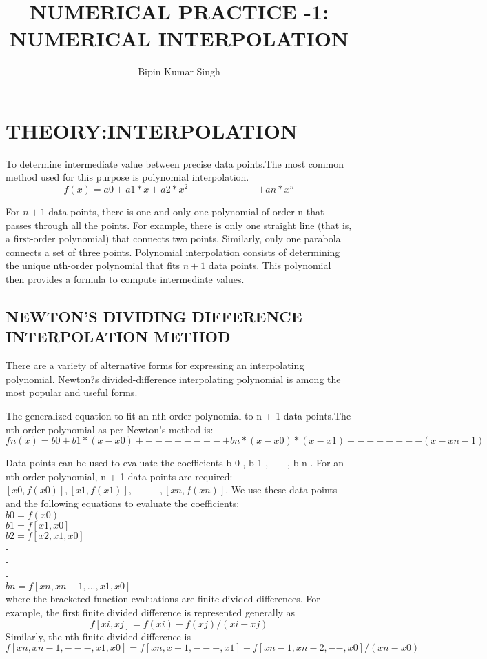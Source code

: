 \documentclass[10pt,a4paper]{article}
\author{Bipin Kumar Singh}
\title{NUMERICAL PRACTICE -1: NUMERICAL INTERPOLATION}
\begin{document}
	\maketitle

\section{THEORY:INTERPOLATION}
To determine intermediate value between precise data points.The most common method used for this purpose is polynomial interpolation.$$ f(x) = a0 + a1 *x+a2 *x ^2 +------ + an *x^ n$$

For $n + 1$ data points, there is one and only one polynomial of order n that passes through all the points. For example, there is only one straight line (that is, a first-order polynomial) that connects two points. Similarly, only one parabola connects a set of three points. Polynomial interpolation consists of determining the unique nth-order polynomial that fits $n + 1$ data points. This polynomial then provides a formula to compute
intermediate values.
\subsection{NEWTON'S DIVIDING DIFFERENCE INTERPOLATION METHOD}
There are a variety of alternative forms for expressing an interpolating
polynomial. Newton?s divided-difference interpolating polynomial is among the most popular and useful forms. 

The generalized equation to fit an nth-order polynomial to n + 1 data points.The nth-order polynomial as per Newton's method is:$$fn(x) = b0 + b1*(x-x 0 ) + -------- + bn*(x-x0)*(x-x1)--------(x-xn-1)$$

Data points can be used to evaluate the coefficients b 0 , b 1 , ---- , b n . For an nth-order polynomial, n + 1 data points are required: $[x 0 , f (x 0 )], [x 1 , f (x 1 )],--- , [x n , f (x n )]$. We use these data points and the following equations to evaluate the coefficients:\\
$b 0 = f(x 0 )$\\
$b 1 = f [x 1 , x 0 ]$\\
$b 2 = f [x 2 , x 1 , x 0 ]$\\
-\\
-\\
-\\
$b n = f [x n , x n-1 , . . . , x 1 , x 0 ]$\\

where the bracketed function evaluations are finite divided differences. For example, the first finite divided difference is represented generally as $$f [x i , x j ] =
f (x i ) - f (x j ) / (x i - x j)$$
Similarly, the nth finite divided difference is$$f [x n , x n-1 , ---, x 1 , x 0 ] =
f [x n , x -1 , --- , x 1 ] - f [x n-1 , x n-2 ,-- , x 0 ]/(x n - x 0)$$
\end{document}
